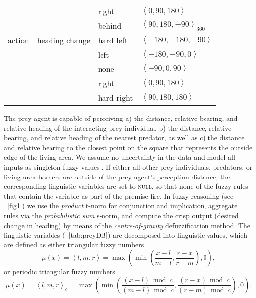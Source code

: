 \begin{table}
\begin{tabular}{lllp{2.7cm}}
		& & right & $\left<0,90,180\right>$ \\
		& & behind & $\left<90,180,-90\right>_{360}$ \\
		\hdashline
		action & heading change & hard left & $\left<-180,-180,-90\right>$ \\
		& & left & $\left<-180,-90,0\right>$ \\
		& & none & $\left<-90,0,90\right>$ \\
		& & right & $\left<0,90,180\right>$ \\
		& & hard right & $\left<90,180,180\right>$ \\
		\bottomrule
	\end{tabular}
\end{table}

The prey agent is capable of perceiving a) the distance, relative bearing, and relative heading of the interacting prey individual, b) the distance, relative bearing, and relative heading of the nearest predator, as well as c) the distance and relative bearing to the closest point on the square that represents the outside edge of the living area. We assume no uncertainty in the data and model all inputs as singleton fuzzy values \cite{mendel2001uncertain}. If either all other prey individuals, predators, or living area borders are outside of the prey agent's perception distance, the corresponding linguistic variables are set to \textsc{null}, so that none of the fuzzy rules that contain the variable as part of the premise fire. In fuzzy reasoning (see \figurename~\ref{fig1}) we use the \emph{product} t-norm for conjunction and implication, aggregate rules via the \emph{probabilistic sum} s-norm, and compute the crisp output (desired change in heading) by means of the \emph{centre-of-gravity} defuzzification method. The linguistic variables (\tablename~\ref{tab:preyDB}) are decomposed into linguistic values, which are defined as either triangular fuzzy numbers 
%
\begin{equation}
\mu(x)=\left<l,m,r\right>=\max{\left(\min\left(\frac{x-l}{m-l}, \frac{r-x}{r-m}\right),0\right)},
\end{equation}
%
or periodic triangular fuzzy numbers
%
\begin{equation}
\mu(x)=\left<l,m,r\right>_c=\max\left(\min\left(\frac{(x-l) \bmod c}{(m-l) \bmod c}, \frac{(r-x) \bmod c}{(r-m) \bmod c}\right),0\right).
\end{equation}

